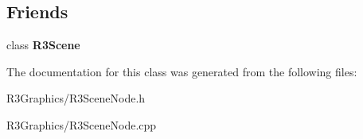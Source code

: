 \subsection*{Friends}
\begin{DoxyCompactItemize}
\item 
class {\bfseries R3\+Scene}\hypertarget{class_r3_scene_node_a54fe3819a921d0481c1732f71cde725d}{}\label{class_r3_scene_node_a54fe3819a921d0481c1732f71cde725d}

\end{DoxyCompactItemize}


The documentation for this class was generated from the following files\+:\begin{DoxyCompactItemize}
\item 
R3\+Graphics/R3\+Scene\+Node.\+h\item 
R3\+Graphics/R3\+Scene\+Node.\+cpp\end{DoxyCompactItemize}
